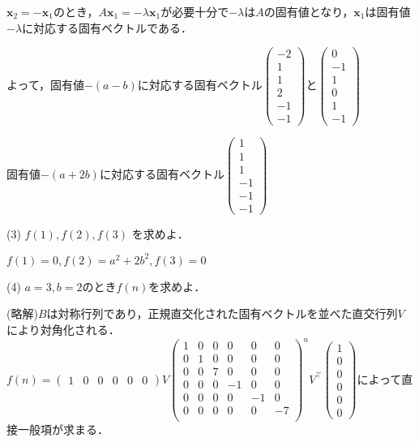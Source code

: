 \documentclass[a4j]{jarticle}
\let \ds \displaystyle
\begin{document}
$\bm{x}_2 = -\bm{x}_1$のとき，$A \bm{x}_1 = -\lambda \bm{x}_1$が必要十分で$-\lambda$は$A$の固有値となり，$\bm{x}_1$は固有値$-\lambda$に対応する固有ベクトルである．

よって，固有値$-(a-b)$に対応する固有ベクトル$\left(\begin{array}{c}-2\\1\\1\\2\\-1\\-1\end{array}\right)$と$\left(\begin{array}{c}0\\-1\\1\\0\\1\\-1\end{array}\right)$

固有値$-(a+2b)$に対応する固有ベクトル$\left(\begin{array}{c}1\\1\\1\\-1\\-1\\-1\end{array}\right)$

\begin{screen}
 (3) $f(1),f(2),f(3)$ を求めよ．
\end{screen}

$f(1)=0,f(2)=a^2+2b^2,f(3)=0$

\begin{screen}
 (4) $a=3,b=2$のとき$f(n)$を求めよ．
\end{screen}

(略解)$B$は対称行列であり，正規直交化された固有ベクトルを並べた直交行列$V$により対角化される．
$\ds f(n)=\begin{pmatrix} 1&0&0&0&0&0 \end{pmatrix}V
\left(
\begin{array}{cccccc}
 1 & 0 & 0 & 0 & 0 & 0 \\
 0 & 1 & 0 & 0 & 0 & 0 \\
 0 & 0 & 7 & 0 & 0 & 0 \\
 0 & 0 & 0 &-1 & 0 & 0 \\
 0 & 0 & 0 & 0 &-1 & 0 \\
 0 & 0 & 0 & 0 & 0 &-7 \\
\end{array}
\right)^n V^\top\left(\begin{array}{c}1\\0\\0\\0\\0\\0\end{array}\right)$によって直接一般項が求まる．
\end{document}
